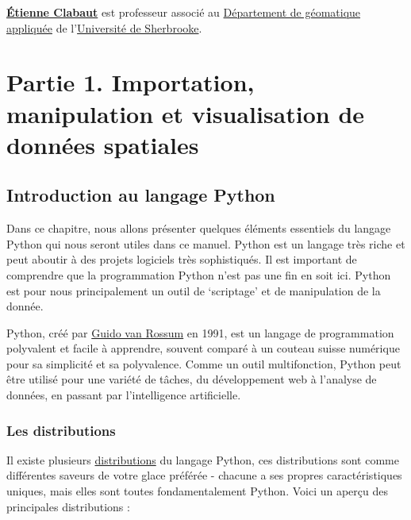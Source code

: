 \documentclass[
  11pt,
  letterpaper,
  open=any,
  twoside=false,
  french]{scrbook}
\begin{document}
\href{https://www.linkedin.com/in/\%C3\%A9tienne-clabaut-793a4176/?originalSubdomain=ca}{\textbf{Étienne
Clabaut}} est professeur associé au
\href{https://www.usherbrooke.ca/geomatique/}{Département de géomatique
appliquée} de l'\href{https://www.usherbrooke.ca/}{Université de
Sherbrooke}.

\part{Partie 1. Importation, manipulation et visualisation de données
spatiales}


\chapter{Introduction au langage Python}\label{sec-chap00}

Dans ce chapitre, nous allons présenter quelques éléments essentiels du
langage Python qui nous seront utiles dans ce manuel. Python est un
langage très riche et peut aboutir à des projets logiciels très
sophistiqués. Il est important de comprendre que la programmation Python
n'est pas une fin en soit ici. Python est pour nous principalement un
outil de `scriptage' et de manipulation de la donnée.

Python, créé par
\href{https://en.wikipedia.org/wiki/Guido_van_Rossum}{Guido van Rossum}
en 1991, est un langage de programmation polyvalent et facile à
apprendre, souvent comparé à un couteau suisse numérique pour sa
simplicité et sa polyvalence. Comme un outil multifonction, Python peut
être utilisé pour une variété de tâches, du développement web à
l'analyse de données, en passant par l'intelligence artificielle.

\section{Les distributions}\label{les-distributions}

Il existe plusieurs
\href{https://wiki.python.org/moin/PythonDistributions}{distributions}
du langage Python, ces distributions sont comme différentes saveurs de
votre glace préférée - chacune a ses propres caractéristiques uniques,
mais elles sont toutes fondamentalement Python. Voici un aperçu des
principales distributions :
\end{document}
